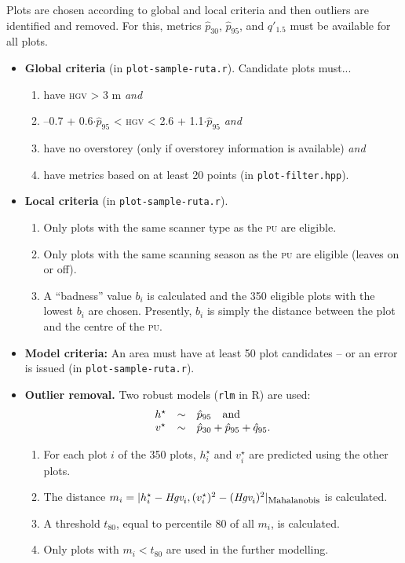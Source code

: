 \documentclass[english,a4paper,minion,nofigsidecaption]{article}
\providecommand{\abbr}[1]{\texorpdfstring{\textsc{\MakeLowercase{#1}}}{#1}}
\newcommand{\pu}{\abbr{PU}}
\newcommand{\first}[1]{\ensuremath{\hat{#1}}}
\newcommand{\perc}[1]{\ensuremath{\first{p}_{#1}}}
\newcommand{\hveg}[1]{\ensuremath{\first{q}_{#1}}}
\newcommand{\prop}[1]{\ensuremath{q'_{#1}}}
\newcommand{\thresholdperc}{80}
\newcommand{\numofplots}{350}
\begin{document}
Plots are chosen according to global and local criteria and then outliers are identified and removed. 
For this, metrics \perc{30}, \perc{95}, and \prop{1.5} must be available for all plots. 
\begin{itemize}
	\item \textbf{Global criteria} (in \texttt{plot-sample-ruta.r}). Candidate plots must...
		\begin{enumerate}
			\item have \abbr{HGV} > 3 m \emph{and} 
			\item –0.7 + 0.6$\cdot$\perc{95} < \abbr{HGV} < 2.6 + 1.1$\cdot$\perc{95} \emph{and}
			\item have no overstorey (only if overstorey information is available) \emph{and} 
			\item have metrics based on at least 20 points (in \texttt{plot-filter.hpp}). 
		\end{enumerate}
	\item \textbf{Local criteria} (in \texttt{plot-sample-ruta.r}).  
		\begin{enumerate}
			\item Only plots with the same scanner type as the {\pu} are eligible. 
			\item Only plots with the same scanning season as the {\pu} are eligible (leaves on or off). 
			\item A “badness” value $b_i$ is calculated and the {\numofplots} eligible plots with the lowest $b_i$ are chosen. Presently, $b_i$ is simply the distance between the plot and the centre of the \pu. 
		\end{enumerate}
	\item \textbf{Model criteria:} An area must have at least 50 plot candidates – or an error is issued (in \texttt{plot-sample-ruta.r}). 
	\item \textbf{Outlier removal.} Two robust models (\texttt{rlm} in R) are used:
		$$
			\begin{array}{c@{\quad\sim\quad}l}
				h^\star   	& \perc{95}	\quad\textrm{and}\\
				v^\star		& \perc{30} + \perc{95} + \hveg{95}.
			\end{array}
		$$
		\begin{enumerate}
			\item For each plot $i$ of the {\numofplots} plots, $h^\star_i$ and $v^\star_i$ are predicted using the other plots. 
			\item The distance $m_i = |h^\star_i - \textit{Hgv}_i, (v^\star_i)^2 - (\textit{Hgv}_i)^2|_\textrm{\footnotesize{Mahalanobis}}$ is calculated. 
			\item A threshold $t_{\thresholdperc}$, equal to percentile {\thresholdperc} of all $m_i$, is calculated. 
			\item Only plots with $m_i < t_{\thresholdperc}$ are used in the further modelling. 
		\end{enumerate}
\end{itemize}
\end{document}
